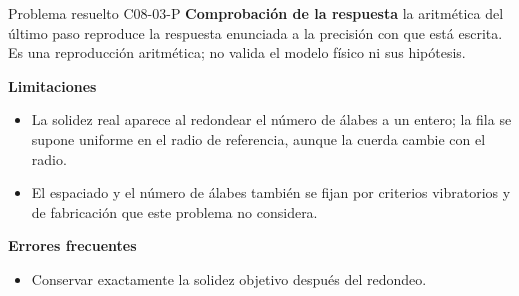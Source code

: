 \documentclass[10pt,openany]{book}
\begin{document}
\begin{studiumworked}{Problema resuelto C08-03-P}
\noindent\textbf{Comprobación de la respuesta} la aritmética del último paso reproduce la respuesta enunciada a la precisión con que está escrita. Es una reproducción aritmética; no valida el modelo físico ni sus hipótesis.

\noindent\textbf{Limitaciones}
\begin{itemize}
\item La solidez real aparece al redondear el número de álabes a un entero; la fila se supone uniforme en el radio de referencia, aunque la cuerda cambie con el radio.
\item El espaciado y el número de álabes también se fijan por criterios vibratorios y de fabricación que este problema no considera.
\end{itemize}

\noindent\textbf{Errores frecuentes}
\begin{itemize}
\item Conservar exactamente la solidez objetivo después del redondeo.
\end{itemize}
\end{studiumworked}
\end{document}
